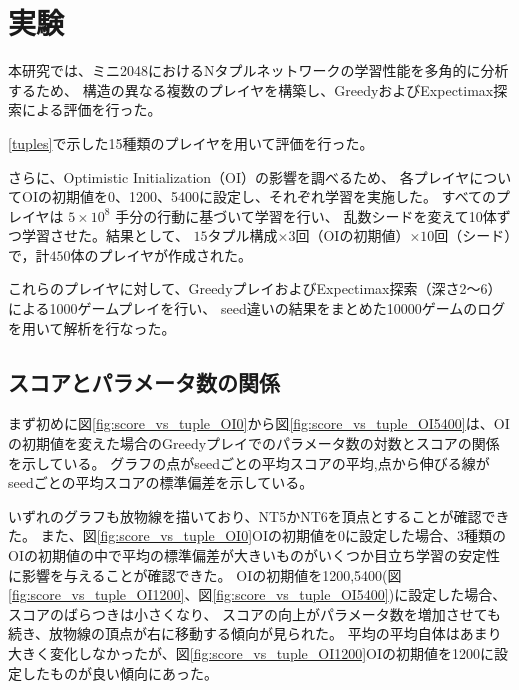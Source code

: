 \section{実験}

本研究では、ミニ2048におけるNタプルネットワークの学習性能を多角的に分析するため、
構造の異なる複数のプレイヤを構築し、GreedyおよびExpectimax探索による評価を行った。

\ref{tuples}で示した15種類のプレイヤを用いて評価を行った。

さらに、Optimistic Initialization（OI）の影響を調べるため、
各プレイヤについてOIの初期値を0、1200、5400に設定し、それぞれ学習を実施した。
すべてのプレイヤは $5 \times 10^8$ 手分の行動に基づいて学習を行い、
乱数シードを変えて10体ずつ学習させた。結果として、
$15$タプル構成$\times 3$回（OIの初期値）$\times 10$回（シード）で，計$450$体のプレイヤが作成された。

これらのプレイヤに対して、GreedyプレイおよびExpectimax探索（深さ2〜6）による1000ゲームプレイを行い、
seed違いの結果をまとめた10000ゲームのログを用いて解析を行なった。

\subsection{スコアとパラメータ数の関係}
まず初めに図\ref{fig:score_vs_tuple_OI0}から図\ref{fig:score_vs_tuple_OI5400}は、OIの初期値を変えた場合のGreedyプレイでのパラメータ数の対数とスコアの関係を示している。
グラフの点がseedごとの平均スコアの平均,点から伸びる線がseedごとの平均スコアの標準偏差を示している。

いずれのグラフも放物線を描いており、NT5かNT6を頂点とすることが確認できた。
また、図\ref{fig:score_vs_tuple_OI0}OIの初期値を0に設定した場合、3種類のOIの初期値の中で平均の標準偏差が大きいものがいくつか目立ち学習の安定性に影響を与えることが確認できた。
OIの初期値を1200,5400(図\ref{fig:score_vs_tuple_OI1200}、図\ref{fig:score_vs_tuple_OI5400})に設定した場合、スコアのばらつきは小さくなり、
スコアの向上がパラメータ数を増加させても続き、放物線の頂点が右に移動する傾向が見られた。
平均の平均自体はあまり大きく変化しなかったが、図\ref{fig:score_vs_tuple_OI1200}OIの初期値を1200に設定したものが良い傾向にあった。

